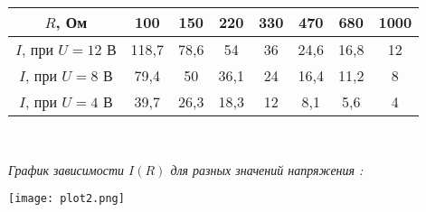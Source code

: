 \documentclass[a4paper,11pt]{article}
\begin{document}
\begin{flushleft}
\begin{center}
			\begin{tabular}{|c|c|c|c|c|c|c|c|}
\hline ${R}$, Ом & 100 & 150 & 220 & 330 & 470 & 680 & 1000 \\ 
\hline ${I}$, при ${U=12 }$ В & 118,7 & 78,6 & 54 & 36 & 24,6 & 16,8 & 12 \\ 
\hline ${I}$, при ${U=8 }$ В & 79,4 & 50 & 36,1 & 24 & 16,4 & 11,2 & 8 \\ 
\hline ${I}$, при ${U=4 }$ В & 39,7 & 26,3 & 18,3 & 12 & 8,1 & 5,6 & 4 \\ 
\hline 
\end{tabular}
		\\
		\medskip 
		\end{center}
		\textit{График зависимости ${I(R)}$ для разных значений напряжения :}
		\\
		\medskip
		\begin{center}
			\texttt{[image: plot2.png]} 
		\end{center}
	\end{flushleft}
\end{document}
